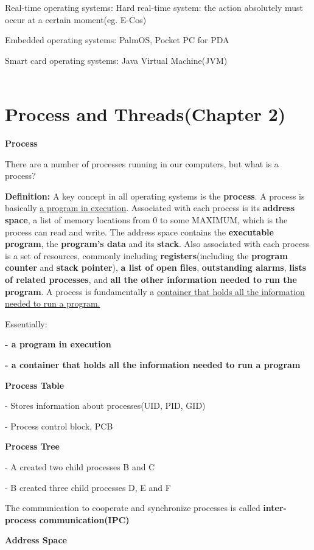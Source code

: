 \documentclass[]{report}
\begin{document}
Real-time operating systems: Hard real-time system: the action absolutely must occur at a certain moment(eg. E-Cos)

Embedded operating systems: PalmOS, Pocket PC for PDA

Smart card operating systems: Java Virtual Machine(JVM)\\\\

\section*{Process and Threads(Chapter 2)}
\textbf{Process}

There are a number of processes running in our computers, but what is a process?

\textbf{Definition:} A key concept in all operating systems is the \textbf{process}. A process is basically \underline{a program in execution}. Associated with each process is its \textbf{address space}, a list of memory locations from 0 to some MAXIMUM, which is the process can read and write. The address space contains the \textbf{executable program}, the \textbf{program's data} and its \textbf{stack}. Also associated with each process is a set of resources, commonly including \textbf{registers}(including the \textbf{program counter} and \textbf{stack pointer}), \textbf{a list of open files}, \textbf{outstanding alarms}, \textbf{lists of related processes}, and \textbf{all the other information needed to run the program}. A process is fundamentally a
\underline{container that holds all the information} \underline{needed to run a program.}

Essentially:

\textbf{- a program in execution}

\textbf{- a container that holds all the information needed to run a program}

\textbf{Process Table}

- Stores information about processes(UID, PID, GID)

- Process control block, PCB

\textbf{Process Tree}

- A created two child processes B and C

- B created three child processes D, E and F

The communication to cooperate and synchronize processes is called \textbf{inter-process communication(IPC)}

\textbf{Address Space}
\end{document}
